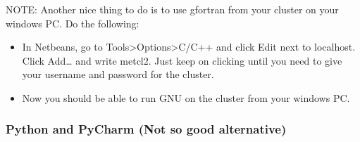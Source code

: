 \documentclass[letterpaper,10pt,english]{sphinxmanual}
\begin{document}
NOTE: Another nice thing to do is to use gfortran from your cluster on
your windows PC. Do the following:
\begin{itemize}
\item {} 
In Netbeans, go to Tools\textgreater{}Options\textgreater{}C/C++ and click Edit next to
localhost. Click Add… and write metcl2. Just keep on clicking until
you need to give your username and password for the cluster.

\item {} 
Now you should be able to run GNU on the cluster from your windows
PC.

\end{itemize}


\subsubsection{Python and PyCharm (Not so good alternative)}
\end{document}
